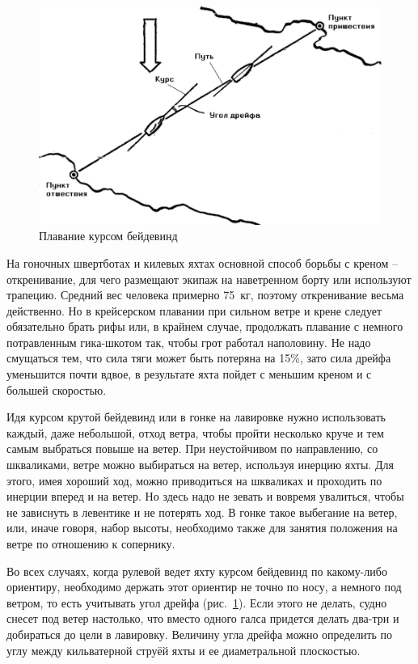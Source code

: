 \documentclass[a4paper, 12pt, twoside, final]{scrbook}
\begin{document}
\begin{figure}[htbp]
   \centering
   \includegraphics{pics/105_Plavanie_kursom_bejdevind} %
   \caption{Плавание курсом бейдевинд}
   \label{fig:105}
\end{figure}

На гоночных швертботах и килевых яхтах основной способ борьбы с креном \--- откренивание, для чего размещают экипаж на наветренном борту или используют трапецию. Средний вес человека примерно 75~кг, поэтому откренивание весьма действенно. Но в крейсерском плавании при сильном ветре и крене следует обязательно брать рифы или, в крайнем случае, продолжать плавание с немного потравленным гика-шкотом так, чтобы грот работал наполовину. Не надо смущаться тем, что сила тяги может быть потеряна на 15\%, зато сила дрейфа уменьшится почти вдвое, в результате яхта пойдет с меньшим креном и с большей скоростью.

Идя курсом крутой бейдевинд или в гонке на лавировке нужно использовать каждый, даже небольшой, отход ветра, чтобы пройти несколько круче и тем самым выбраться повыше на ветер. При неустойчивом по направлению, со шкваликами, ветре можно выбираться на ветер, используя инерцию яхты. Для этого, имея хороший ход, можно приводиться на шкваликах и проходить по инерции вперед и на ветер. Но здесь надо не зевать и вовремя увалиться, чтобы не зависнуть в левентике и не потерять ход. В гонке такое выбегание на ветер, или, иначе говоря, набор высоты, необходимо также для занятия положения на ветре по отношению к сопернику.

Во всех случаях, когда рулевой ведет яхту курсом бейдевинд по какому-либо ориентиру, необходимо держать этот ориентир не точно по носу, а немного под ветром, то есть учитывать угол дрейфа (рис.~\ref{fig:105}). Если этого не делать, судно снесет под ветер настолько, что вместо одного галса придется делать два-три и добираться до цели в лавировку. Величину угла дрейфа можно определить по углу между кильватерной струёй яхты и ее диаметральной плоскостью.
\end{document}
